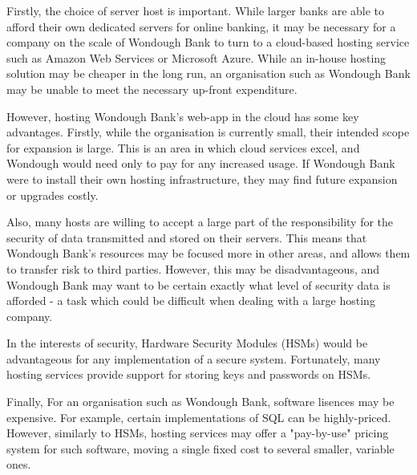 Firstly, the choice of server host is important. While larger banks are able to afford their own dedicated servers for online banking, it may be necessary for a company on the scale of Wondough Bank to turn to a cloud-based hosting service such as Amazon Web Services or Microsoft Azure. While an in-house hosting solution may be cheaper in the long run, an organisation such as Wondough Bank may be unable to meet the necessary up-front expenditure.

However, hosting Wondough Bank's web-app in the cloud has some key advantages. Firstly, while the organisation is currently small, their intended scope for expansion is large. This is an area in which cloud services excel, and Wondough would need only to pay for any increased usage. If Wondough Bank were to install their own hosting infrastructure, they may find future expansion or upgrades costly.

Also, many hosts are willing to accept a large part of the responsibility for the security of data transmitted and stored on their servers. This means that Wondough Bank's resources may be focused more in other areas, and allows them to transfer risk to third parties. However, this may be disadvantageous, and Wondough Bank may want to be certain exactly what level of security data is afforded - a task which could be difficult when dealing with a large hosting company.

In the interests of security, Hardware Security Modules (HSMs) would be advantageous for any implementation of a secure system. Fortunately, many hosting services provide support for storing keys and passwords on HSMs.

Finally, For an organisation such as Wondough Bank, software lisences may be expensive. For example, certain implementations of SQL can be highly-priced. However, similarly to HSMs, hosting services may offer a "pay-by-use" pricing system for such software, moving a single fixed cost to several smaller, variable ones.


